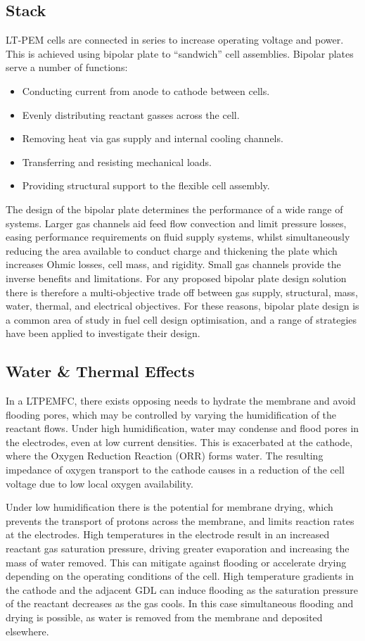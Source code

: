 \subsection{Stack}
LT-PEM cells are connected in series to increase operating voltage and power. This is achieved using bipolar plate to “sandwich” cell assemblies. Bipolar plates serve a number of functions:
\begin{itemize}
	\item Conducting current from anode to cathode between cells.
	\item Evenly distributing reactant gasses across the cell.
	\item Removing heat via gas supply and internal cooling channels.
	\item Transferring and resisting mechanical loads.
	\item Providing structural support to the flexible cell assembly.
\end{itemize}
The design of the bipolar plate determines the performance of a wide range of systems. Larger gas channels aid feed flow convection and limit pressure losses, easing performance requirements on fluid supply systems, whilst simultaneously reducing the area available to conduct charge and thickening the plate which increases Ohmic losses, cell mass, and rigidity. Small gas channels provide the inverse benefits and limitations. For any proposed bipolar plate design solution there is therefore a multi-objective trade off between gas supply, structural, mass, water, thermal, and electrical objectives. For these reasons, bipolar plate design is a common area of study in fuel cell design optimisation, and a range of strategies have been applied to investigate their design.

\subsection{Water \& Thermal Effects}
In a LTPEMFC, there exists opposing needs to hydrate the membrane and avoid flooding pores, which may be controlled by varying the humidification of the reactant flows. Under high humidification, water may condense and flood pores in the electrodes, even at low current densities. This is exacerbated at the cathode, where the Oxygen Reduction Reaction (ORR) forms water. The resulting impedance of oxygen transport to the cathode causes in a reduction of the cell voltage due to low local oxygen availability.

Under low humidification there is the potential for membrane drying, which prevents the transport of protons across the membrane, and limits reaction rates at the electrodes. High temperatures in the electrode result in an increased reactant gas saturation pressure, driving greater evaporation and increasing the mass of water removed. This can mitigate against flooding or accelerate drying depending on the operating conditions of the cell. High temperature gradients in the cathode and the adjacent GDL can induce flooding as the saturation pressure of the reactant decreases as the gas cools. In this case simultaneous flooding and drying is possible, as water is removed from the membrane and deposited elsewhere.


